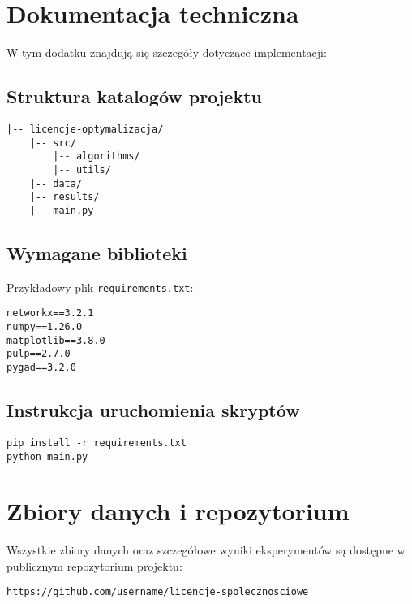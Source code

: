 \section{Dokumentacja techniczna}

W tym dodatku znajdują się szczegóły dotyczące implementacji:

\subsection{Struktura katalogów projektu}

\begin{verbatim}
|-- licencje-optymalizacja/
    |-- src/
        |-- algorithms/
        |-- utils/
    |-- data/
    |-- results/
    |-- main.py
\end{verbatim}

\subsection{Wymagane biblioteki}

Przykładowy plik \texttt{requirements.txt}:

\begin{verbatim}
networkx==3.2.1
numpy==1.26.0
matplotlib==3.8.0
pulp==2.7.0
pygad==3.2.0
\end{verbatim}

\subsection{Instrukcja uruchomienia skryptów}

\begin{verbatim}
pip install -r requirements.txt
python main.py
\end{verbatim}

\section{Zbiory danych i repozytorium}

Wszystkie zbiory danych oraz szczegółowe wyniki eksperymentów są dostępne w publicznym repozytorium projektu:

\begin{verbatim}
https://github.com/username/licencje-spolecznosciowe
\end{verbatim}
